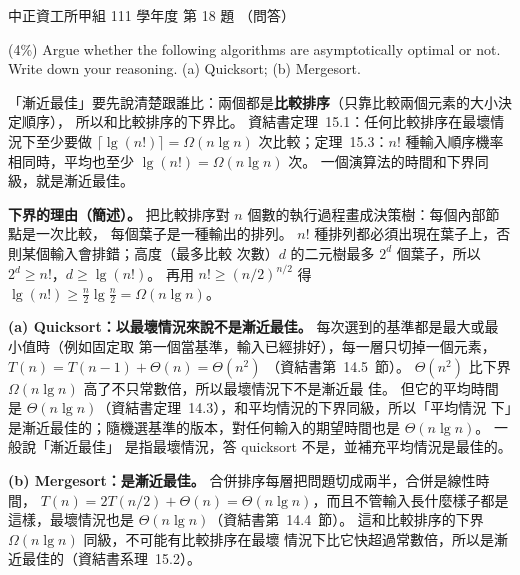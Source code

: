 \begin{pastexam}[label={px:ccu-111-swa-10}]{中正資工所甲組 111 學年度 第 18 題}
（問答）

(4\%) Argue whether the following algorithms are asymptotically optimal or not. Write down your
reasoning. (a) Quicksort; (b) Mergesort.
\end{pastexam}

\begin{pastsoln}
「漸近最佳」要先說清楚跟誰比：兩個都是\textbf{比較排序}（只靠比較兩個元素的大小決定順序），
所以和比較排序的下界比。 資結書定理~15.1：任何比較排序在最壞情況下至少要做
$\lceil \lg(n!) \rceil = \Omega(n \lg n)$ 次比較；定理~15.3：$n!$ 種輸入順序機率相同時，平均也至少
$\lg(n!) = \Omega(n \lg n)$ 次。 一個演算法的時間和下界同級，就是漸近最佳。

\textbf{下界的理由（簡述）。} 把比較排序對 $n$ 個數的執行過程畫成決策樹：每個內部節點是一次比較，
每個葉子是一種輸出的排列。 $n!$ 種排列都必須出現在葉子上，否則某個輸入會排錯；高度（最多比較
次數）$d$ 的二元樹最多 $2^d$ 個葉子，所以 $2^d \ge n!$，$d \ge \lg(n!)$。 再用
$n! \ge (n/2)^{n/2}$ 得 $\lg(n!) \ge \frac{n}{2} \lg \frac{n}{2} = \Omega(n \lg n)$。

\textbf{(a) Quicksort：以最壞情況來說不是漸近最佳。} 每次選到的基準都是最大或最小值時（例如固定取
第一個當基準，輸入已經排好），每一層只切掉一個元素，$T(n) = T(n - 1) + \Theta(n) = \Theta(n^2)$
（資結書第~14.5~節）。 $\Theta(n^2)$ 比下界 $\Omega(n \lg n)$ 高了不只常數倍，所以最壞情況下不是漸近最
佳。 但它的平均時間是 $\Theta(n \lg n)$（資結書定理~14.3），和平均情況的下界同級，所以「平均情況
下」是漸近最佳的；隨機選基準的版本，對任何輸入的期望時間也是 $\Theta(n \lg n)$。 一般說「漸近最佳」
是指最壞情況，答 quicksort 不是，並補充平均情況是最佳的。

\textbf{(b) Mergesort：是漸近最佳。} 合併排序每層把問題切成兩半，合併是線性時間，
$T(n) = 2T(n/2) + \Theta(n) = \Theta(n \lg n)$，而且不管輸入長什麼樣子都是這樣，最壞情況也是
$\Theta(n \lg n)$（資結書第~14.4~節）。 這和比較排序的下界 $\Omega(n \lg n)$ 同級，不可能有比較排序在最壞
情況下比它快超過常數倍，所以是漸近最佳的（資結書系理~15.2）。
\end{pastsoln}
